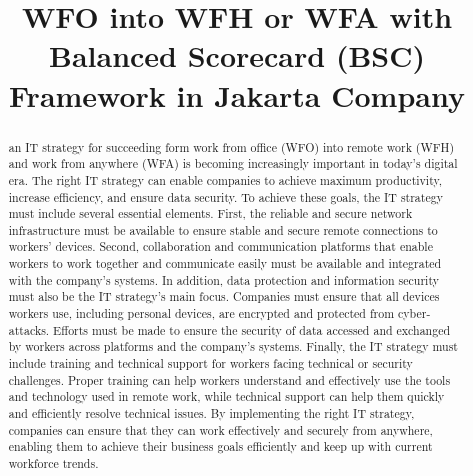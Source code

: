 \documentclass[conference]{IEEEtran}
\begin{document}
\title{WFO into WFH or WFA with Balanced Scorecard (BSC) Framework in Jakarta Company\\
{ \textsuperscript{}}
}

\author{
\and
{}


}

\maketitle

\begin{abstract}
an IT strategy for succeeding form work from office (WFO) into remote work (WFH) and work from anywhere (WFA) is becoming increasingly important in today's digital era. The right IT strategy can enable companies to achieve maximum productivity, increase efficiency, and ensure data security. To achieve these goals, the IT strategy must include several essential elements. First, the reliable and secure network infrastructure must be available to ensure stable and secure remote connections to workers' devices. Second, collaboration and communication platforms that enable workers to work together and communicate easily must be available and integrated with the company's systems. In addition, data protection and information security must also be the IT strategy's main focus. Companies must ensure that all devices workers use, including personal devices, are encrypted and protected from cyber-attacks. Efforts must be made to ensure the security of data accessed and exchanged by workers across platforms and the company's systems. Finally, the IT strategy must include training and technical support for workers facing technical or security challenges. Proper training can help workers understand and effectively use the tools and technology used in remote work, while technical support can help them quickly and efficiently resolve technical issues. By implementing the right IT strategy, companies can ensure that they can work effectively and securely from anywhere, enabling them to achieve their business goals efficiently and keep up with current workforce trends.

\end{abstract}
\end{document}
